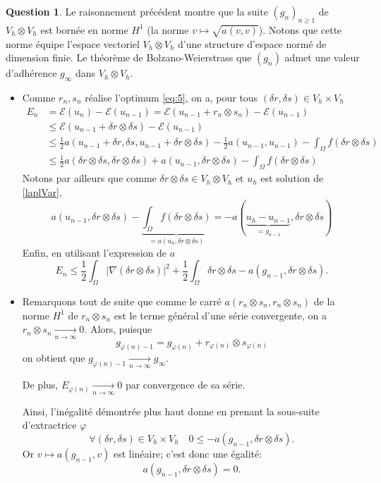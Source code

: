 \documentclass[11pt]{article}
\theoremstyle{definition}
\newtheorem{ques}{Question}
\begin{document}
\begin{ques}
Le raisonnement précédent montre que la suite $(g_n)_{n\geq 1}$ de $V_h\otimes V_h$ est bornée en norme $H^1$ (la norme $v\longmapsto \sqrt{a(v,v)}$). Notons que cette norme équipe l'espace vectoriel $V_h\otimes V_h$ d'une structure d'espace normé de dimension finie. Le théorème de Bolzano-Weierstrass que $(g_n)$ admet une valeur d'adhérence $g_\infty$ dans $V_h\otimes V_h$.


\begin{itemize}
\item Comme $r_n,s_n$ réalise l'optimum \eqref{eq:5}, on a, pour tous $(\delta r,\delta s)\in V_h\times V_h$
\begin{align*}
E_n &= 
\mathcal{E}(u_n) - \mathcal{E}(u_{n-1}) = \mathcal{E}(u_{n-1}+r_n\otimes s_n) - \mathcal{E}(u_{n-1}) \\
&\leq \mathcal E(u_{n-1} +\delta r\otimes\delta s) - \mathcal E(u_{n-1}) \\
&\leq \frac 12a(u_{n-1}+\delta r,\delta s,u_{n-1} + \delta r\otimes \delta s) - \frac 12a(u_{n-1},u_{n-1}) - \int_\Omega f(\delta r\otimes\delta s) \\
&\leq \frac 12a(\delta r\otimes\delta s,\delta r\otimes\delta s) + a(u_{n-1},\delta r\otimes\delta s) - \int_\Omega f(\delta r\otimes\delta s)
\end{align*}
Notons par ailleurs que comme $\delta r\otimes\delta s\in V_h\otimes V_h$ et $u_h$ est solution de \eqref{laplVar},
\[
a(u_{n-1},\delta r\otimes\delta s) - \underbrace{\int_\Omega f(\delta r\otimes\delta s)}_{= a(u_h,\delta r\otimes\delta s)}= -a(\underbrace{u_h-u_{n-1}}_{=g_{n-1}},\delta r\otimes\delta s)
\]
Enfin, en utilisant l'expression de $a$
\[
\boxed{E_n \leq \frac12 \int_\Omega |\nabla(\delta r\otimes\delta s)|^2 + \frac 12\int_\Omega \delta r\otimes\delta s - a(g_{n-1},\delta r\otimes\delta s).}
\]

\item Remarquons tout de suite que comme le carré $a(r_n\otimes s_n,r_n\otimes s_n)$ de la norme $H^1$ de $r_n\otimes s_n$ est le terme général d'une série convergente, on a $r_n\otimes s_n\xrightarrow[n\to\infty]{}0$. Alors, puisque
\[
g_{\varphi(n)-1} = g_{\varphi(n)} + r_{\varphi(n)}\otimes s_{\varphi(n)}
\]
on obtient que $g_{\varphi(n)-1}\xrightarrow[n\to\infty]{}g_\infty$.

De plus, $E_{\varphi(n)}\xrightarrow[n\to\infty]{}0$ par convergence de sa série.

Ainsi, l'inégalité démontrée plus haut donne en prenant la sous-suite d'extractrice $\varphi$
\[
\forall (\delta r,\delta s)\in V_h\times V_h\quad
0\leq -a(g_{n-1},\delta r\otimes\delta s).
\]
Or $v\longmapsto a(g_{n-1},v)$ est linéaire; c'est donc une égalité:
\[
a(g_{n-1},\delta r\otimes\delta s) = 0.
\]


\end{itemize}
\end{ques}
\end{document}
